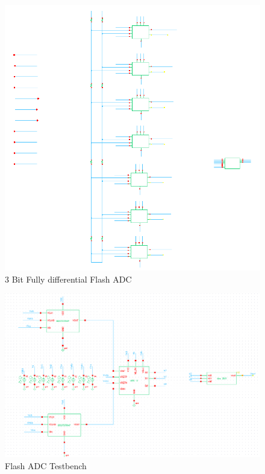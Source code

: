 \documentclass[a4paper,12pt]{article}
\begin{document}
\begin{figure}[H]
    \centering
    \includegraphics[max width = \textwidth]{Flash_ADC_images/flash_adc.png}
    \caption{3 Bit Fully differential Flash ADC}
    \label{fig:enter-label}
\end{figure}

\begin{figure}[H]
    \centering
    \includegraphics[max width = \textwidth]{Flash_ADC_images/flash_adc_test.png}
    \caption{Flash ADC Testbench}
    \label{fig:enter-label}
\end{figure}
\end{document}
